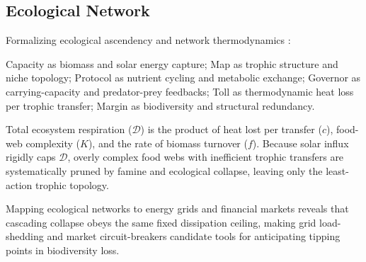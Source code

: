 \subsection{Ecological Network}
Formalizing ecological ascendency and network thermodynamics \cite{ulanowicz_growth_1986}:
\begin{description}[leftmargin=0pt]
    \item[Architecture] Capacity as biomass and solar energy capture; Map as trophic structure and niche topology; Protocol as nutrient cycling and metabolic exchange; Governor as carrying-capacity and predator-prey feedbacks; Toll as thermodynamic heat loss per trophic transfer; Margin as biodiversity and structural redundancy.
    \item[Dynamics] Total ecosystem respiration ($\mathcal{D}$) is the product of heat lost per transfer ($c$), food-web complexity ($K$), and the rate of biomass turnover ($f$). Because solar influx rigidly caps $\mathcal{D}$, overly complex food webs with inefficient trophic transfers are systematically pruned by famine and ecological collapse, leaving only the least-action trophic topology.
    \item[Cross-Domain Transfer] Mapping ecological networks to energy grids and financial markets reveals that cascading collapse obeys the same fixed dissipation ceiling, making grid load-shedding and market circuit-breakers candidate tools for anticipating tipping points in biodiversity loss.
\end{description}

